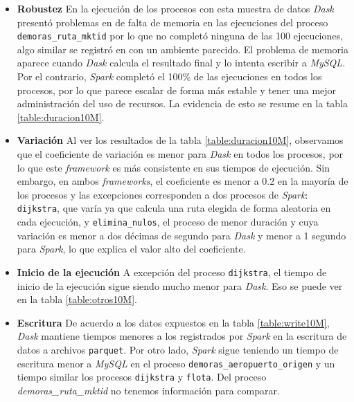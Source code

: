 \begin{itemize}

	\item \textbf{Robustez} En la ejecución de los procesos con esta muestra de datos \textit{Dask} presentó problemas en de falta de memoria en las ejecuciones del proceso \texttt{demoras\_ruta\_mktid} por lo que no completó ninguna de las 100 ejecuciones, algo similar se registró en \cite{comparative-evolution} con un ambiente parecido. El problema de memoria aparece cuando \textit{Dask} calcula el resultado final y lo intenta escribir a \textit{MySQL}. Por el contrario, \textit{Spark} completó el 100\% de las ejecuciones en todos los procesos, por lo que parece escalar de forma más estable y tener una mejor administración del uso de recursos. La evidencia de esto se resume en la tabla \ref{table:duracion10M}.
	
	\item \textbf{Variación} Al ver los resultados de la tabla \ref{table:duracion10M}, observamos que el coeficiente de variación es menor para \textit{Dask} en todos los procesos, por lo que este \textit{framework} es más consistente en sus tiempos de ejecución. Sin embargo, en ambos \textit{frameworks}, el coeficiente es menor a 0.2 en la mayoría de los procesos y las excepciones corresponden a dos procesos de \textit{Spark}: \texttt{dijkstra}, que varía ya que calcula una ruta elegida de forma aleatoria en cada ejecución, y \texttt{elimina\_nulos}, el proceso de menor duración y cuya variación es menor a dos décimas de segundo para \textit{Dask} y menor a 1 segundo para \textit{Spark}, lo que explica el valor alto del coeficiente.
	
	\item \textbf{Inicio de la ejecución} A excepción del proceso \texttt{dijkstra}, el tiempo de inicio de la ejecución sigue siendo mucho menor para \textit{Dask}. Eso se puede ver en la tabla \ref{table:otros10M}.
	
	\item \textbf{Escritura} De acuerdo a los datos expuestos en la tabla \ref{table:write10M}, \textit{Dask} mantiene tiempos menores a los registrados por \textit{Spark} en la escritura de datos a archivos \texttt{parquet}. Por otro lado, \textit{Spark} sigue teniendo un tiempo de escritura menor a \textit{MySQL} en el proceso \texttt{demoras\_aeropuerto\_origen} y un tiempo similar los procesos \texttt{dijkstra} y \texttt{flota}. Del proceso \textit{demoras\_ruta\_mktid} no tenemos información para comparar. 
	

\end{itemize}
